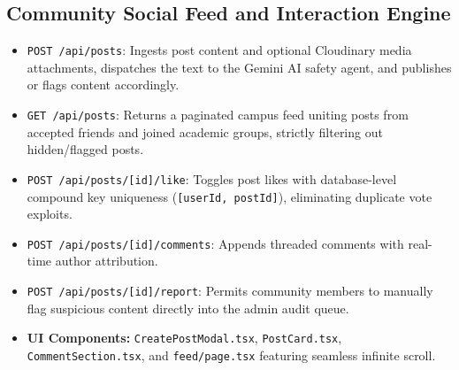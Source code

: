 \documentclass[12pt, a4paper, oneside]{report}
\begin{document}
\subsection{Community Social Feed and Interaction Engine}
\begin{itemize}[leftmargin=0.7cm]
    \item \texttt{POST /api/posts}: Ingests post content and optional Cloudinary media attachments, dispatches the text to the Gemini AI safety agent, and publishes or flags content accordingly.
    \item \texttt{GET /api/posts}: Returns a paginated campus feed uniting posts from accepted friends and joined academic groups, strictly filtering out hidden/flagged posts.
    \item \texttt{POST /api/posts/[id]/like}: Toggles post likes with database-level compound key uniqueness (\texttt{[userId, postId]}), eliminating duplicate vote exploits.
    \item \texttt{POST /api/posts/[id]/comments}: Appends threaded comments with real-time author attribution.
    \item \texttt{POST /api/posts/[id]/report}: Permits community members to manually flag suspicious content directly into the admin audit queue.
    \item \textbf{UI Components:} \texttt{CreatePostModal.tsx}, \texttt{PostCard.tsx}, \texttt{CommentSection.tsx}, and \texttt{feed/page.tsx} featuring seamless infinite scroll.
\end{itemize}
\end{document}
